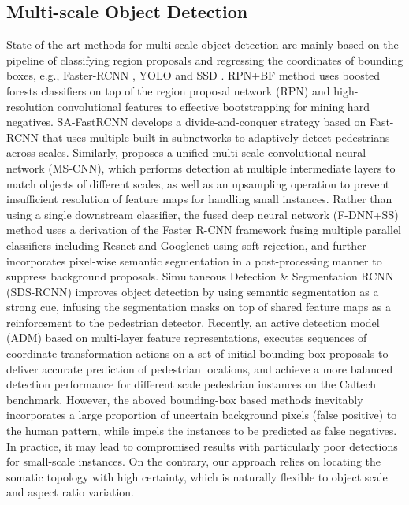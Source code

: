 \documentclass[runningheads]{llncs}
\begin{document}
\subsection{Multi-scale Object Detection}
State-of-the-art methods for multi-scale object detection are mainly based on the pipeline of classifying region proposals and regressing the coordinates of bounding boxes, e.g., Faster-RCNN \cite{RCNN,FRCNN,RFCN}, YOLO \cite{YOLO1,YOLO2} and SSD \cite{SSD}. RPN+BF method \cite{FRCNNPD} uses boosted forests classiﬁers on top of the region proposal network (RPN) and high-resolution convolutional features to effective bootstrapping for mining hard negatives. SA-FastRCNN \cite{SAFRCNN} develops a divide-and-conquer strategy based on Fast-RCNN that uses multiple built-in subnetworks to adaptively detect pedestrians across scales. Similarly, \cite{MSCNN} proposes a uniﬁed multi-scale convolutional neural network (MS-CNN), which performs detection at multiple intermediate layers to match objects of different scales, as well as an upsampling operation to prevent insufficient resolution of feature maps for handling small instances. Rather than using a single downstream classifier, the fused deep neural network (F-DNN+SS) method \cite{FDNN} uses a derivation of the Faster R-CNN framework fusing multiple parallel classifiers including Resnet \cite{ResNet} and Googlenet \cite{GoogleNet} using soft-rejection, and further incorporates pixel-wise semantic segmentation in a post-processing manner to suppress background proposals. Simultaneous Detection \& Segmentation RCNN (SDS-RCNN) \cite{SDSRCNN} improves object detection by using semantic segmentation as a strong cue, infusing the segmentation masks on top of shared feature maps as a reinforcement to the pedestrian detector. Recently, an active detection model (ADM) \cite{ADM} based on multi-layer feature representations, executes sequences of coordinate transformation actions on a set of initial bounding-box proposals to deliver accurate prediction of pedestrian locations, and achieve a more balanced detection performance for different scale pedestrian instances on the Caltech benchmark. However, the aboved bounding-box based methods inevitably incorporates a large proportion of uncertain background pixels (false positive) to the human pattern, while impels the instances to be predicted as false negatives. In practice, it may lead to compromised results with particularly poor detections for small-scale instances. On the contrary, our approach relies on locating the somatic topology with high certainty, which is naturally flexible to object scale and aspect ratio variation.
\end{document}
